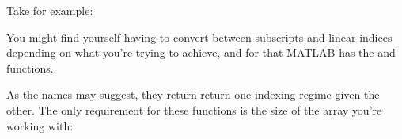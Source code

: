 \documentclass{article}
\begin{document}
Take for example:


You might find yourself having to convert between subscripts and linear
indices depending on what you're trying to achieve, and for that MATLAB
has the  and  functions.

As the names may suggest, they return return one indexing regime given
the other.  The only requirement for these functions is the size of the
array you're working with:


\end{document}
